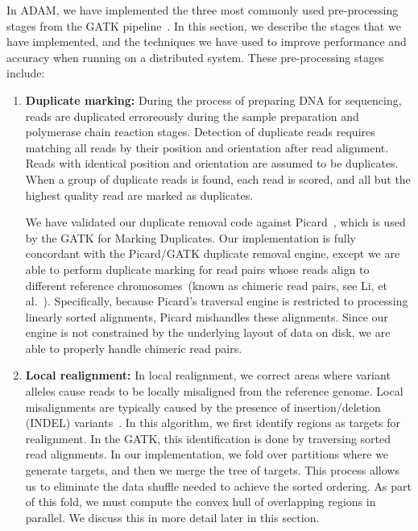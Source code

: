 \documentclass[phd]{ucbthesis}
\begin{document}
In {ADAM}, we have implemented the three most commonly used pre-processing stages from the
{GATK} pipeline~\cite{depristo11}. In this section, we describe the stages that we have
implemented, and the techniques we have used to improve performance and accuracy when running on
a distributed system. These pre-processing stages include:

\begin{enumerate}
\item \textbf{Duplicate marking:} During the process of preparing DNA for sequencing, reads are duplicated
erroreously during the sample preparation and polymerase chain reaction stages. Detection of duplicate reads
requires matching all reads by their position and orientation after read alignment. Reads with identical position
and orientation are assumed to be duplicates. When a group of duplicate reads is found, each read is scored,
and all but the highest quality read are marked as duplicates.

We have validated our duplicate removal code against Picard~\cite{picard}, which is used by the GATK
for Marking Duplicates. Our implementation is fully concordant with the Picard/GATK duplicate removal
engine, except we are able to perform duplicate marking for read pairs whose reads align to different
reference chromosomes~(known as chimeric read pairs, see Li, et al.~\cite{li10}).
Specifically, because Picard's traversal engine is restricted to processing linearly sorted alignments,
Picard mishandles these alignments. Since our engine is not constrained by the underlying layout of data
on disk, we are able to properly handle chimeric read pairs.
\item \textbf{Local realignment:} In local realignment, we correct areas where variant alleles cause reads to be
locally misaligned from the reference genome. Local misalignments are typically caused by the presence of
insertion/deletion (INDEL) variants~\cite{depristo11}. In this algorithm, we first identify regions
as targets for realignment. In the {GATK}, this identification is done by traversing sorted read alignments. In our implementation,
we fold over partitions where we generate targets, and then we merge the tree of targets. This process allows us
to eliminate the data shuffle needed to achieve the sorted ordering. As part of this fold, we must
compute the convex hull of overlapping regions in parallel. We discuss this in more detail later in this section.


\end{enumerate}
\end{document}
